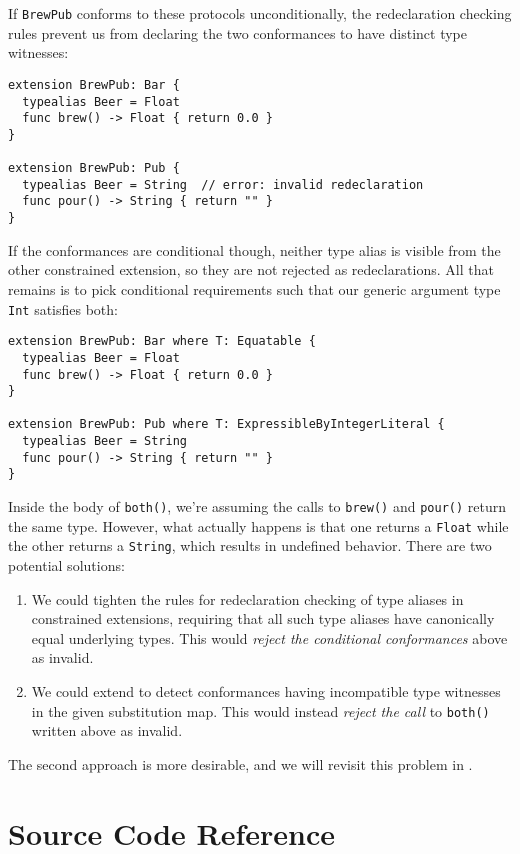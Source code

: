 \documentclass[../generics]{subfiles}
\begin{document}
If \texttt{BrewPub} conforms to these protocols unconditionally, the redeclaration checking rules prevent us from declaring the two conformances to have distinct type witnesses:
\begin{Verbatim}
extension BrewPub: Bar {
  typealias Beer = Float
  func brew() -> Float { return 0.0 }
}

extension BrewPub: Pub {
  typealias Beer = String  // error: invalid redeclaration
  func pour() -> String { return "" }
}
\end{Verbatim}
If the conformances are conditional though, neither type alias is visible from the other constrained extension, so they are not rejected as redeclarations. All that remains is to pick conditional requirements such that our generic argument type \texttt{Int} satisfies both:
\begin{Verbatim}
extension BrewPub: Bar where T: Equatable {
  typealias Beer = Float
  func brew() -> Float { return 0.0 }
}

extension BrewPub: Pub where T: ExpressibleByIntegerLiteral {
  typealias Beer = String
  func pour() -> String { return "" }
}
\end{Verbatim}
Inside the body of \texttt{both()}, we're assuming the calls to \texttt{brew()} and \texttt{pour()} return the same type. However, what actually happens is that one returns a \texttt{Float} while the other returns a \texttt{String}, which results in undefined behavior. There are two potential solutions:
\begin{enumerate}
\item We could tighten the rules for redeclaration checking of type aliases in constrained extensions, requiring that all such type aliases have canonically equal underlying types. This would \textsl{reject the conditional conformances} above as invalid.
\item We could extend  to detect conformances having incompatible type witnesses in the given substitution map. This would instead \textsl{reject the call} to \texttt{both()} written above as invalid.
\end{enumerate}
The second approach is more desirable, and we will revisit this problem in .

\section{Source Code Reference}\label{extensionssourceref}
\end{document}
